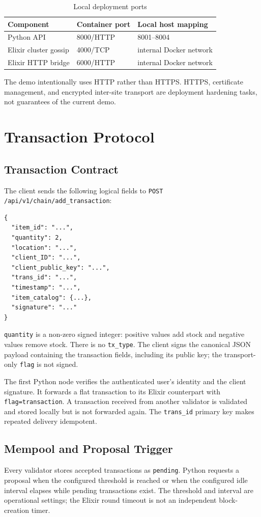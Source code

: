 \documentclass[11pt,a4paper]{memoir}
\begin{document}
\begin{table}[htbp]
\centering
\caption{Local deployment ports}
\begin{tabular}{lll}
\toprule
\textbf{Component} & \textbf{Container port} & \textbf{Local host mapping}\\
\midrule
Python API & 8000/HTTP & 8001--8004\\
Elixir cluster gossip & 4000/TCP & internal Docker network\\
Elixir HTTP bridge & 6000/HTTP & internal Docker network\\
\bottomrule
\end{tabular}
\end{table}

The demo intentionally uses HTTP rather than HTTPS. HTTPS, certificate
management, and encrypted inter-site transport are deployment hardening tasks,
not guarantees of the current demo.

\chapter{Transaction Protocol}

\section{Transaction Contract}
The client sends the following logical fields to
\texttt{POST /api/v1/chain/add\_transaction}:
\begin{lstlisting}
{
  "item_id": "...",
  "quantity": 2,
  "location": "...",
  "client_ID": "...",
  "client_public_key": "...",
  "trans_id": "...",
  "timestamp": "...",
  "item_catalog": {...},
  "signature": "..."
}
\end{lstlisting}
\texttt{quantity} is a non-zero signed integer: positive values add stock and
negative values remove stock. There is no \texttt{tx\_type}. The client signs
the canonical JSON payload containing the transaction fields, including its
public key; the transport-only \texttt{flag} is not signed.

The first Python node verifies the authenticated user's identity and the
client signature. It forwards a flat transaction to its Elixir counterpart
with \texttt{flag=transaction}. A transaction received from another validator
is validated and stored locally but is not forwarded again. The
\texttt{trans\_id} primary key makes repeated delivery idempotent.

\section{Mempool and Proposal Trigger}
Every validator stores accepted transactions as \texttt{pending}. Python
requests a proposal when the configured threshold is reached or when the
configured idle interval elapses while pending transactions exist. The
threshold and interval are operational settings; the Elixir round timeout is
not an independent block-creation timer.
\end{document}
